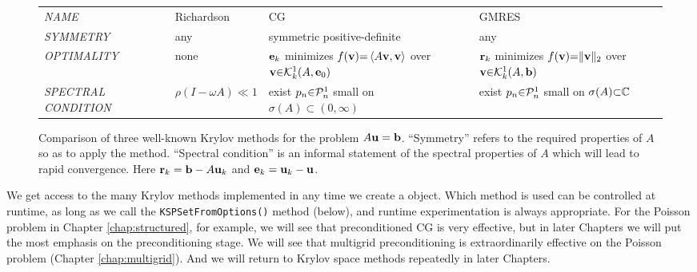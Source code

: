 \newcommand{\mpwide}{28mm}
\bigskip
\begin{figure}[h]
\small
\begin{tabular}{llll} \vspace{5mm}
\emph{NAME}\hspace{0.5in} & Richardson & CG & GMRES \\ \vspace{5mm}
\emph{SYMMETRY} & any & \begin{minipage}[l]{\mpwide}symmetric positive-definite\end{minipage} & any \\ \vspace{5mm}
\emph{OPTIMALITY} & none & \begin{minipage}[l]{25mm}$\mathbf{e}_k$ minimizes $f(\mathbf{v}){=}\left<A\mathbf{v},\mathbf{v}\right>$ over $\mathbf{v}{\in}\mathcal{K}_{k}^1(A,\mathbf{e}_0)$\end{minipage} & \begin{minipage}[l]{\mpwide}$\mathbf{r}_k$ minimizes $f(\mathbf{v}){=}\|\mathbf{v}\|_2$ over $\mathbf{v}{\in}\mathcal{K}_{k}^1(A,\mathbf{b})$\end{minipage} \\ \vspace{5mm}
\begin{minipage}[l]{21mm}\emph{SPECTRAL} \emph{CONDITION}\end{minipage} & $\rho(I-\omega A) \ll 1$ & \begin{minipage}[l]{\mpwide}exist $p_n{\in}\mathcal{P}_n^1$ small on $\sigma(A){\subset}(0,\infty)$\end{minipage} & \begin{minipage}[l]{\mpwide}exist $p_n{\in}\mathcal{P}_n^1$ small on $\sigma(A){\subset}\mathbb{C}$\end{minipage}
\end{tabular}
\caption{Comparison of three well-known Krylov methods for the problem $A\mathbf{u}=\mathbf{b}$.  ``Symmetry'' refers to the required properties of $A$ so as to apply the method.  ``Spectral condition'' is an informal statement of the spectral properties of $A$ which will lead to rapid convergence.  Here $\mathbf{r}_k=\mathbf{b}-A\mathbf{u}_k$ and $\mathbf{e}_k=\mathbf{u}_k-\mathbf{u}$.} \label{tab:krylovcompare}
\end{figure}

We get access to the many Krylov methods implemented in \PETSc any time we create a \pKSP object.  Which method is used can be controlled at runtime, as long as we call the \texttt{KSPSetFromOptions()} method (below), and runtime experimentation is always appropriate.  For the Poisson problem in Chapter \ref{chap:structured}, for example, we will see that preconditioned CG is very effective, but in later Chapters we will put the most emphasis on the preconditioning stage.  We will see that multigrid preconditioning is extraordinarily effective on the Poisson problem (Chapter \ref{chap:multigrid}).  And we will return to Krylov space methods repeatedly in later Chapters.

